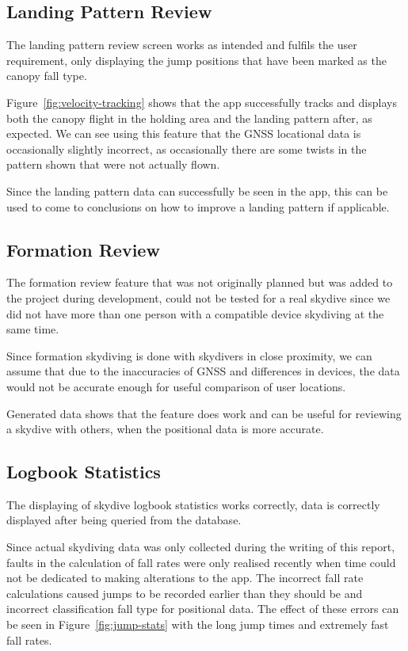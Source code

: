 \subsection{Landing Pattern Review}
The landing pattern review screen works as intended and fulfils the user requirement, only displaying the jump positions that have been marked as the canopy fall type.

Figure~\vref{fig:velocity-tracking} shows that the app successfully tracks and displays both the canopy flight in the holding area and the landing pattern after, as expected. We can see using this feature that the GNSS locational data is occasionally slightly incorrect, as occasionally there are some twists in the pattern shown that were not actually flown.

Since the landing pattern data can successfully be seen in the app, this can be used to come to conclusions on how to improve a landing pattern if applicable.

\subsection{Formation Review}
The formation review feature that was not originally planned but was added to the project during development, could not be tested for a real skydive since we did not have more than one person with a compatible device skydiving at the same time.

Since formation skydiving is done with skydivers in close proximity, we can assume that due to the inaccuracies of GNSS and differences in devices, the data would not be accurate enough for useful comparison of user locations.

Generated data shows that the feature does work and can be useful for reviewing a skydive with others, when the positional data is more accurate.

\subsection{Logbook Statistics}
The displaying of skydive logbook statistics works correctly, data is correctly displayed after being queried from the database.

Since actual skydiving data was only collected during the writing of this report, faults in the calculation of fall rates were only realised recently when time could not be dedicated to making alterations to the app. The incorrect fall rate calculations caused jumps to be recorded earlier than they should be and incorrect classification fall type for positional data. The effect of these errors can be seen in Figure~\vref{fig:jump-stats} with the long jump times and extremely fast fall rates.

